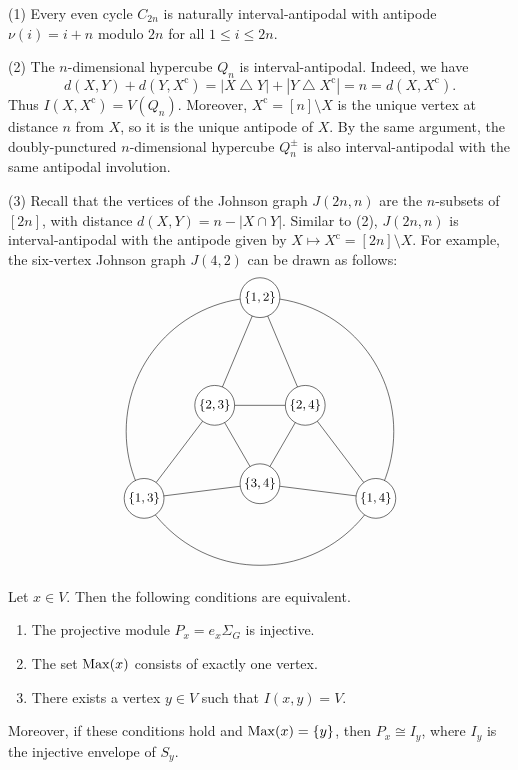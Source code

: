 \documentclass[a4paper,leqno]{amsart}
\begin{document}
\begin{eg}\label{ex:interval-antipodals}
(1) Every even cycle $C_{2n}$ is naturally interval-antipodal with antipode $\nu(i) = i+n$ modulo $2n$ for all $1\le i\le 2n$.

(2) The $n$-dimensional hypercube $Q_n$ is interval-antipodal.  Indeed, we have
$$d(X,Y)+d(Y,X^{\mathrm c})
=|X\mathbin{\triangle}Y|
 +|Y\mathbin{\triangle}X^{\mathrm c}|
=n=d(X,X^{\mathrm c}).$$
Thus $I(X,X^{\mathrm c})=V(Q_n)$. Moreover, $X^{\mathrm c}=[n]\setminus X$ is the unique vertex at distance $n$ from $X$, so it is the unique antipode of $X$.
By the same argument, the doubly-punctured $n$-dimensional hypercube $Q_n^{\pm}$ is also interval-antipodal with the same antipodal involution.

(3) Recall that the vertices of the Johnson graph $J(2n,n)$ are the $n$-subsets of $[2n]$, with distance $d(X,Y)=n-|X\cap Y|$.  Similar to (2), $J(2n,n)$ is interval-antipodal with the antipode given by $X\mapsto X^{\mathrm c}=[2n]\setminus X$.  For example, the six-vertex Johnson graph $J(4,2)$ can be drawn as follows:
\[
\begin{tikzpicture}[
    scale=1.05,
    vertex/.style={
        circle,
        draw,
        fill=white,
        minimum size=10mm,
        inner sep=1pt,
        outer sep=0pt,
        font=\small
    }
]
\draw (0,0) circle[radius=3.2];

\node[vertex] (v12) at (90:3.2)  {$\{1,2\}$};
\node[vertex] (v13) at (210:3.2) {$\{1,3\}$};
\node[vertex] (v14) at (330:3.2) {$\{1,4\}$};

\node[vertex] (v34) at (270:1.25) {$\{3,4\}$};
\node[vertex] (v24) at (30:1.25)  {$\{2,4\}$};
\node[vertex] (v23) at (150:1.25) {$\{2,3\}$};

\draw (v23) -- (v24);
\draw (v24) -- (v34);
\draw (v34) -- (v23);

\draw (v12) -- (v23);
\draw (v12) -- (v24);

\draw (v13) -- (v23);
\draw (v13) -- (v34);

\draw (v14) -- (v24);
\draw (v14) -- (v34);
\end{tikzpicture}
\]
\end{eg}

\begin{lem}\label{lem:proj-inj-max}
Let $x\in V$. Then the following conditions are equivalent.
\begin{enumerate}
\item The projective module $P_x=e_x\Sigma_G$ is injective.
\item The set $\operatorname{Max}(x)$ consists of exactly one vertex.
\item There exists a vertex $y\in V$ such that $I(x,y)=V$.
\end{enumerate}
Moreover, if these conditions hold and $\operatorname{Max}(x)=\{y\}$, then
$P_x\cong I_y$, where $I_y$ is the injective envelope of $S_y$.
\end{lem}
\end{document}
